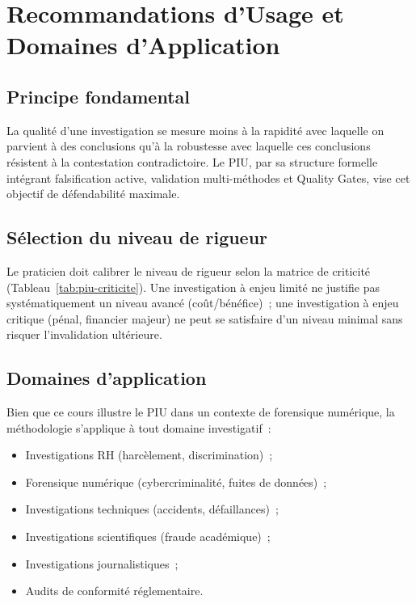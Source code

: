\section{Recommandations d'Usage et Domaines d'Application}
\label{sec:piu-recommandations}

\subsection{Principe fondamental}

La qualité d'une investigation se mesure moins à la rapidité avec laquelle on
parvient à des conclusions qu'à la robustesse avec laquelle ces conclusions
résistent à la contestation contradictoire. Le PIU, par sa structure formelle
intégrant falsification active, validation multi-méthodes et Quality Gates,
vise cet objectif de défendabilité maximale.

\subsection{Sélection du niveau de rigueur}

Le praticien doit calibrer le niveau de rigueur selon la matrice de criticité
(Tableau~\ref{tab:piu-criticite}). Une investigation à enjeu limité ne justifie
pas systématiquement un niveau avancé (coût/bénéfice)~; une investigation à
enjeu critique (pénal, financier majeur) ne peut se satisfaire d'un niveau
minimal sans risquer l'invalidation ultérieure.

\subsection{Domaines d'application}

Bien que ce cours illustre le PIU dans un contexte de forensique numérique,
la méthodologie s'applique à tout domaine investigatif~:
\begin{itemize}
    \item Investigations RH (harcèlement, discrimination)~;
    \item Forensique numérique (cybercriminalité, fuites de données)~;
    \item Investigations techniques (accidents, défaillances)~;
    \item Investigations scientifiques (fraude académique)~;
    \item Investigations journalistiques~;
    \item Audits de conformité réglementaire.
\end{itemize}

